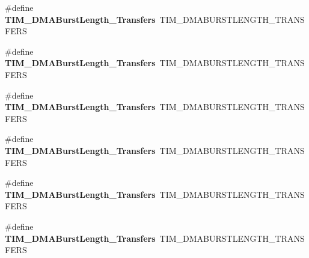 \begin{DoxyCompactItemize}
\item 
\mbox{\label{group___h_a_l___t_i_m___aliased___defines_gaf2ae83bd73b0e92b73e5ebfc11f9bfad}} 
\#define {\bfseries T\+I\+M\+\_\+\+D\+M\+A\+Burst\+Length\+\_\+Transfers}~T\+I\+M\+\_\+\+D\+M\+A\+B\+U\+R\+S\+T\+L\+E\+N\+G\+T\+H\+\_\+T\+R\+A\+N\+S\+F\+E\+RS
\item 
\mbox{\label{group___h_a_l___t_i_m___aliased___defines_ga8a760d7114425596736b0ecdbe5fdea6}} 
\#define {\bfseries T\+I\+M\+\_\+\+D\+M\+A\+Burst\+Length\+\_\+Transfers}~T\+I\+M\+\_\+\+D\+M\+A\+B\+U\+R\+S\+T\+L\+E\+N\+G\+T\+H\+\_\+T\+R\+A\+N\+S\+F\+E\+RS
\item 
\mbox{\label{group___h_a_l___t_i_m___aliased___defines_ga98b208205c133557a9d67a0921559a66}} 
\#define {\bfseries T\+I\+M\+\_\+\+D\+M\+A\+Burst\+Length\+\_\+Transfers}~T\+I\+M\+\_\+\+D\+M\+A\+B\+U\+R\+S\+T\+L\+E\+N\+G\+T\+H\+\_\+T\+R\+A\+N\+S\+F\+E\+RS
\item 
\mbox{\label{group___h_a_l___t_i_m___aliased___defines_ga2fc09f2148cf6ebddc8e67116212259c}} 
\#define {\bfseries T\+I\+M\+\_\+\+D\+M\+A\+Burst\+Length\+\_\+Transfers}~T\+I\+M\+\_\+\+D\+M\+A\+B\+U\+R\+S\+T\+L\+E\+N\+G\+T\+H\+\_\+T\+R\+A\+N\+S\+F\+E\+RS
\item 
\mbox{\label{group___h_a_l___t_i_m___aliased___defines_ga0ca63a3caeaf1e85bd54961891949de7}} 
\#define {\bfseries T\+I\+M\+\_\+\+D\+M\+A\+Burst\+Length\+\_\+Transfers}~T\+I\+M\+\_\+\+D\+M\+A\+B\+U\+R\+S\+T\+L\+E\+N\+G\+T\+H\+\_\+T\+R\+A\+N\+S\+F\+E\+RS
\item 
\mbox{\label{group___h_a_l___t_i_m___aliased___defines_ga9160d52913bbd7ad1e663ff943d01852}} 
\#define {\bfseries T\+I\+M\+\_\+\+D\+M\+A\+Burst\+Length\+\_\+Transfers}~T\+I\+M\+\_\+\+D\+M\+A\+B\+U\+R\+S\+T\+L\+E\+N\+G\+T\+H\+\_\+T\+R\+A\+N\+S\+F\+E\+RS
\item 
\mbox{\label{group___h_a_l___t_i_m___aliased___defines_ga11485e9eee8a6a7edc1df868755eab85}} 

\end{DoxyCompactItemize}
